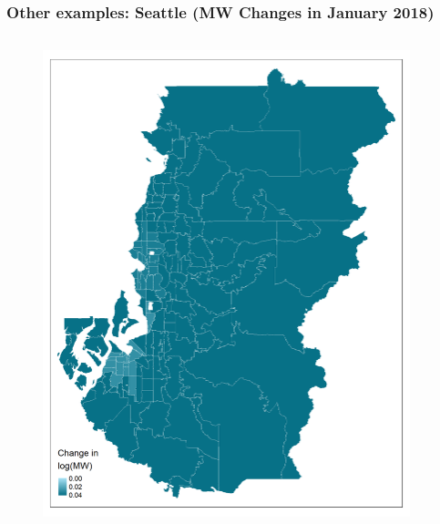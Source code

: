 \documentclass[aspectratio=169, t]{beamer}
\begin{document}
\begin{frame}[label = bay_example]
\begin{columns}
\begin{column}{0.50\textwidth}
\begin{figure}
            \end{figure}   
        \end{column}
    \end{columns}
    \hyperlink{chi_example}{}
\end{frame}

\begin{frame}[label = seattle_example]
\frametitle{Other examples: Seattle (MW Changes in January 2018)}
    \begin{columns}
        \begin{column}{0.50\textwidth}
            \vspace{-4mm}
            \begin{figure}
                \centering
                \includegraphics[scale = 0.36]{maps_events/output/seattle_2018-12_actual_mw.png}
            \end{figure}   
        \end{column}
        \begin{column}{0.50\textwidth}

\end{column}
\end{columns}
\end{frame}
\end{document}
